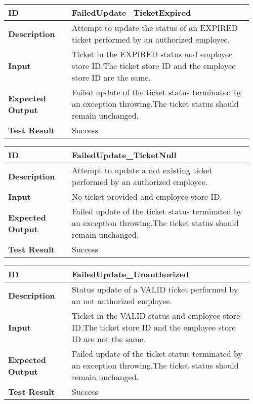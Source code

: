 \begin{table}[H]
	\centering
	\begin{tabular}{@{}p{0.25\linewidth}p{0.71\linewidth}@{}}
		\toprule
		\textbf{ID} & FailedUpdate\_TicketExpired \\
		\midrule
		\textbf{Description} & Attempt to update the status of an EXPIRED ticket performed by an authorized employee. \\
		\midrule
		\textbf{Input} & Ticket in the EXPIRED status and employee store ID.\newline The ticket store ID and the employee store ID are the same.\\
		\midrule
		\textbf{Expected Output} & Failed update of the ticket status terminated by an exception throwing.\newline The ticket status should remain unchanged. \\
		\midrule
		\textbf{Test Result} & Success\\
		\bottomrule
	\end{tabular}
\end{table}

\begin{table}[H]
	\centering
	\begin{tabular}{@{}p{0.25\linewidth}p{0.71\linewidth}@{}}
		\toprule
		\textbf{ID} & FailedUpdate\_TicketNull \\
		\midrule
		\textbf{Description} & Attempt to update a not existing ticket performed by an authorized employee. \\
		\midrule
		\textbf{Input} & No ticket provided and employee store ID.\\
		\midrule
		\textbf{Expected Output} & Failed update of the ticket status terminated by an exception throwing.\newline The ticket status should remain unchanged. \\
		\midrule
		\textbf{Test Result} & Success\\
		\bottomrule
	\end{tabular}
\end{table}

\begin{table}[H]
	\centering
	\begin{tabular}{@{}p{0.25\linewidth}p{0.71\linewidth}@{}}
		\toprule
		\textbf{ID} & FailedUpdate\_Unauthorized \\
		\midrule
		\textbf{Description} & Status update of a VALID ticket performed by an not authorized employee. \\
		\midrule
		\textbf{Input} & Ticket in the VALID status and employee store ID.\newline The ticket store ID and the employee store ID are not the same.\\
		\midrule
		\textbf{Expected Output} & Failed update of the ticket status terminated by an exception throwing.\newline The ticket status should remain unchanged. \\
		\midrule
		\textbf{Test Result} & Success\\
		\bottomrule
	\end{tabular}
\end{table}